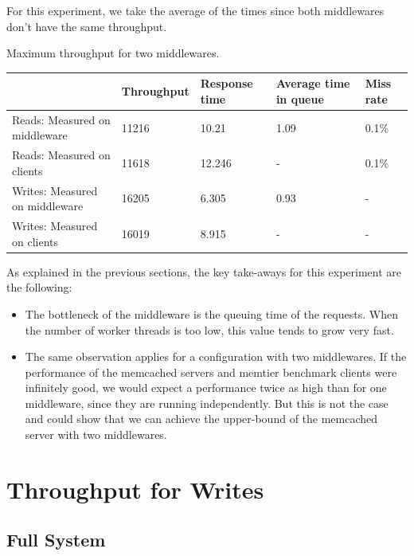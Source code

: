 \documentclass[11pt,a4paper]{article}
\begin{document}
For this experiment, we take the average of the times since both middlewares don't have the same throughput. 
\begin{center}
	{Maximum throughput for two middlewares.}
	\begin{tabular}{|l|p{2cm}|p{2cm}|p{2cm}|p{2cm}|}
		\hline                                & Throughput & Response time & Average time in queue & Miss rate \\ 
		\hline Reads: Measured on middleware  &11216            &10.21               &1.09                       &0.1\%           \\
		\hline Reads: Measured on clients     & 11618            &12.246               &-                   &0.1\%           \\ 
		\hline Writes: Measured on middleware &16205            &6.305               &0.93                       &-       \\ 
		\hline Writes: Measured on clients    &16019            &8.915               &-                   &-       \\ 
		\hline 
	\end{tabular}
\end{center}

As explained in the previous sections, the key take-aways for this experiment are the following:

\begin{itemize}
\item The bottleneck of the middleware is the queuing time of the requests. When the number of worker threads is too low, this value tends to grow very fast.  
\item The same observation applies for a configuration with two middlewares. If the performance of the memcached servers and memtier benchmark clients were infinitely good, we would expect a performance twice as high than for one middleware, since they are running independently. But this is not the case and could show that we can achieve the upper-bound of the memcached server with two middlewares. 
\end{itemize}
\newpage

\section{Throughput for Writes}

\subsection{Full System}
\end{document}
